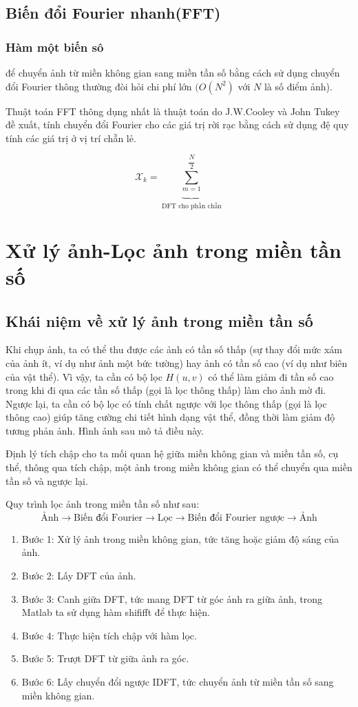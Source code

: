 \documentclass[12pt,a4paper]{report}
\numberwithin{equation}{section}
\theoremstyle{definition} %
\begin{document}
\subsection{Biến đổi Fourier nhanh(FFT)}
\subsubsection{Hàm một biến sô}
để chuyển ảnh từ miền không gian sang miền tần số bằng cách sử dụng chuyển đổi Fourier thông thường đòi hỏi chi phí lớn $(O(N^2)$ với $N$ là số điểm ảnh).

Thuật toán FFT thông dụng nhất là thuật toán do J.W.Cooley và John Tukey đề xuất, tính chuyển đổi Fourier cho các giá trị rời rạc bằng cách sử dụng đệ quy tính các giá trị ở vị trí chẵn lẻ. 


\begin{equation}
\mathcal{X}_k = \underbrace{\sum_{m=1}^{\dfrac{N}{2}}}_{ \text{DFT cho phần chẵn}}
\end{equation}
\section{Xử lý ảnh-Lọc ảnh trong miền tần số}
\subsection{Khái niệm về xử lý ảnh trong miền tần số}
Khi chụp ảnh, ta có thể thu được các ảnh có tần số thấp (sự thay đổi mức xám của ảnh ít, ví dụ như ảnh một bức tường) hay ảnh có tần số cao (ví dụ như biên của vật thể). Vì vậy, ta cần có bộ lọc $H(u,v)$ có thể làm giảm đi tần số cao trong khi đi qua các tần số thấp (gọi là lọc thông thấp) làm cho ảnh mờ đi. Ngược lại, ta cần có bộ lọc có tính chất ngược với lọc thông thấp (gọi là lọc thông cao) giúp tăng cường chi tiết hình dạng vật thể, đồng thời làm giảm độ tương phản ảnh. Hình ảnh sau mô tả điều này.

Định lý tích chập cho ta mối quan hệ giữa miền không gian và miền tần số, cụ thể, thông qua tích chập, một ảnh trong miền không gian có thể chuyển qua miền tần số và ngược lại.

Quy trình lọc ảnh trong miền tần số như sau:
\[\text{Ảnh}\rightarrow\text{Biến đổi Fourier}\rightarrow\text{Lọc}\rightarrow\text{Biến đổi Fourier ngược}
\rightarrow\text{Ảnh}\]
\begin{enumerate}
\item Bước 1: Xử lý ảnh trong miền không gian, tức tăng hoặc giảm độ sáng của ảnh.
\item Bước 2: Lấy DFT của ảnh.
\item Bước 3: Canh giữa DFT, tức mang DFT từ góc ảnh ra giữa ảnh, trong Matlab ta sử dụng hàm shififft để thực hiện.
\item Bước 4: Thực hiện tích chập với hàm lọc.
\item Bước 5: Trượt DFT từ giữa ảnh ra góc.
\item Bước 6: Lấy chuyển đổi ngược IDFT, tức chuyển ảnh từ miền tần số sang miền không gian.
\end{enumerate}
\end{document}
